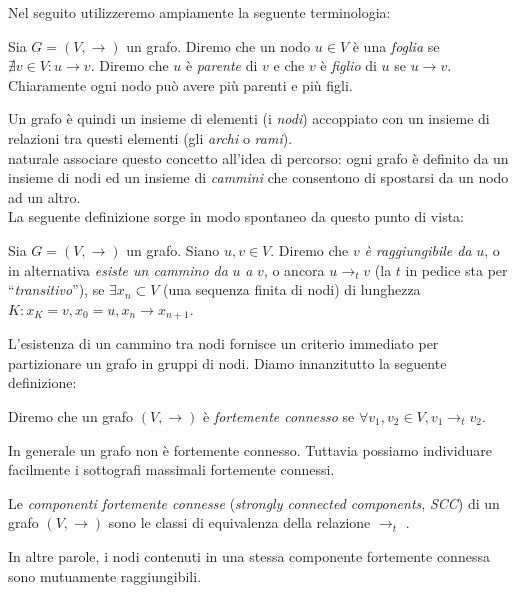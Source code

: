 Nel seguito utilizzeremo ampiamente la seguente terminologia:
\begin{definition}
    Sia $G = (V,\to)$ un grafo. Diremo che un nodo $u \in V$ è una \emph{foglia} se $\nexists v \in V : u \to v$. Diremo che $u$ è \emph{parente} di $v$ e che $v$ è \emph{figlio} di $u$ se $u \to v$. Chiaramente ogni nodo può avere più parenti e più figli.
\end{definition}
Un grafo è quindi un insieme di elementi (i \emph{nodi}) accoppiato con un insieme di relazioni tra questi elementi (gli \emph{archi} o \emph{rami}).\\
\accente naturale associare questo concetto all'idea di percorso: ogni grafo è definito da un insieme di nodi ed un insieme di \emph{cammini} che consentono di spostarsi da un nodo ad un altro.\\
La seguente definizione sorge in modo spontaneo da questo punto di vista:
\begin{definition}
    Sia $G = (V, \to)$ un grafo. Siano $u,v \in V$. Diremo che $v$ \emph{è raggiungibile da} $u$, o in alternativa \emph{esiste un cammino da} $u$ \emph{a} $v$, o ancora $u \to_t v$ (la $t$ in pedice sta per ``\emph{transitivo}''), se
    $\exists x_n \subset V$ (una sequenza finita di nodi) di lunghezza $K : x_K = v, x_0 = u, x_n \to x_{n+1}$.
\end{definition}
L'esistenza di un cammino tra nodi fornisce un criterio immediato per partizionare un grafo in gruppi di nodi. Diamo innanzitutto la seguente definizione:
\begin{definition}
    Diremo che un grafo $(V,\to)$ è \emph{fortemente connesso} se $\forall v_1, v_2 \in V, v_1 \to_t v_2$.
\end{definition}
In generale un grafo non è fortemente connesso. Tuttavia possiamo individuare facilmente i sottografi massimali fortemente connessi.
\begin{definition}
    Le \emph{componenti fortemente connesse} (\emph{strongly connected components}, \emph{SCC}) di un grafo $(V,\to)$ sono le classi di equivalenza della relazione $\to_t$ \cite[Appendice B]{clrs}.
\end{definition}
In altre parole, i nodi contenuti in una stessa componente fortemente connessa sono mutuamente raggiungibili.
